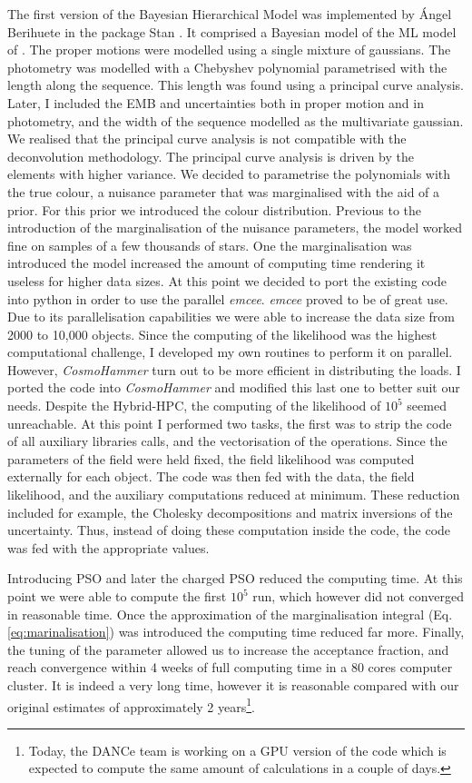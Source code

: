 The first version of the Bayesian Hierarchical Model was implemented by \'Angel Berihuete in the package Stan \citep{}. It comprised a Bayesian model of the ML model of \citet{Sarro2014}. The proper motions were modelled using a single mixture of gaussians. The photometry was modelled with a Chebyshev polynomial parametrised with the length along the sequence. This length was found using a principal curve analysis. Later, I included the EMB and uncertainties both in proper motion and in photometry, and the width of the sequence modelled as the multivariate gaussian. We realised that the principal curve analysis is not compatible with the deconvolution methodology. The principal curve analysis is driven by the elements with higher variance. We decided to parametrise the polynomials with the true colour, a nuisance parameter that was marginalised with the aid of a prior. For this prior we introduced the colour distribution. Previous to the introduction of the marginalisation of the nuisance parameters, the model worked fine on samples of a few thousands of stars. One the marginalisation was introduced the model increased the amount of computing time rendering it useless for higher data sizes. At this point we decided to port the existing code into python in order to use the parallel \emph{emcee}. \emph{emcee} proved to be of great use. Due to its parallelisation capabilities we were able to increase the data size from 2000 to 10,000 objects. Since the computing of the likelihood was the highest computational challenge, I developed my own routines to perform it on parallel. However, \emph{CosmoHammer} \citep{Akeret2013} turn out to be more efficient in distributing the loads. I ported the code into \emph{CosmoHammer} and modified this last one to better suit our needs. Despite the Hybrid-HPC, the computing of the likelihood of $10^5$ seemed unreachable. At this point I performed two tasks, the first was to strip the code of all auxiliary libraries calls, and the vectorisation of the operations. Since the parameters of the field were held fixed, the field likelihood was computed externally for each object. The code was then fed with the data, the field likelihood, and the auxiliary computations reduced at minimum. These reduction included for example, the Cholesky decompositions and matrix inversions of the uncertainty. Thus, instead of doing these computation inside the code, the code was fed with the appropriate values.

Introducing PSO and later the charged PSO reduced the computing time.  At this point we were able to compute the first $10^5$ run, which however did not converged in reasonable time. Once the approximation of the marginalisation integral (Eq. \ref{eq:marinalisation}) was introduced the computing time reduced far more. Finally, the tuning of the parameter allowed us to increase the acceptance fraction, and reach convergence within 4 weeks of full computing time in a 80 cores computer cluster. It is indeed a very long time, however it is reasonable compared with our original estimates of approximately 2 years\footnote{Today, the DANCe team is working on a GPU version of the code which is expected to compute the same amount of calculations in a couple of days.}.

